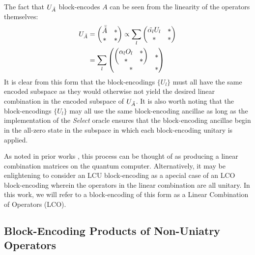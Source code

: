 The fact that $U_{\Tilde{A}}$ block-encodes $A$ can be seen from the linearity of the operators themselves:
\begin{equation}
    \begin{split}
        U_{\Tilde{A}} &= 
        \begin{pmatrix}
        \bar{\Tilde{A}} & * \\
        * & * 
        \end{pmatrix} \propto
        \sum_{l}
        \begin{pmatrix}
        \Tilde{\alpha_l} U_l & * \\
        * & * 
        \end{pmatrix} \\
        & =\sum_{l}
        \begin{pmatrix}
        \begin{pmatrix}
            \alpha_l O_l & * \\
            * & * 
        \end{pmatrix} & * \\
        * & * 
        \end{pmatrix} 
    \end{split}
\end{equation}
It is clear from this form that the block-encodings $\{U_l\}$ must all have the same encoded subspace as they would otherwise not yield the desired linear combination in the encoded subspace of $U_{\Tilde{A}}$.
It is also worth noting that the block-encodings $\{U_l\}$ may all use the same block-encoding ancillae as long as the implementation of the \textit{Select} oracle ensures that the block-encoding ancillae begin in the all-zero state in the subspace in which each block-encoding unitary is applied.

As noted in prior works \cite{berry2015simulating, childs2017quantum, gilyen2019quantum, lin2022lecture, jennings2023efficient}, this process can be thought of as producing a linear combination matrices on the quantum computer.
Alternatively, it may be enlightening to consider an LCU block-encoding as a apecial case of an LCO block-encoding wherein the operators in the linear combination are all unitary.
In this work, we will refer to a block-encoding of this form as a Linear Combination of Operators (LCO).

\subsection{Block-Encoding Products of Non-Uniatry Operators}
\label{subsec:be-products}

